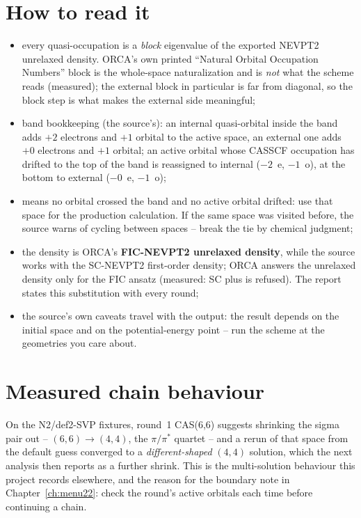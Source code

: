 \section{How to read it}

\begin{readbox}
\begin{itemize}
  \item every quasi-occupation is a \emph{block} eigenvalue of the exported
    NEVPT2 unrelaxed density.  ORCA's own printed ``Natural Orbital Occupation
    Numbers'' block is the whole-space naturalization and is \emph{not} what
    the scheme reads (measured); the external block in particular is far from
    diagonal, so the block step is what makes the external side meaningful;
  \item band bookkeeping (the source's): an internal quasi-orbital inside the
    band adds $+2$ electrons and $+1$ orbital to the active space, an external
    one adds $+0$ electrons and $+1$ orbital; an active orbital whose CASSCF
    occupation has drifted to the top of the band is reassigned to internal
    ($-2$~e, $-1$~o), at the bottom to external ($-0$~e, $-1$~o);
  \item {} means no orbital crossed the band and no active
    orbital drifted: use that space for the production calculation.  If the
    same space was visited before, the source warns of cycling between spaces
    -- break the tie by chemical judgment;
  \item the density is ORCA's \textbf{FIC-NEVPT2 unrelaxed density}, while the
    source works with the SC-NEVPT2 first-order density; ORCA answers the
    unrelaxed density only for the FIC ansatz (measured: SC plus
     is refused).  The report states this substitution
    with every round;
  \item the source's own caveats travel with the output: the result depends on
    the initial space and on the potential-energy point -- run the scheme at
    the geometries you care about.
\end{itemize}
\end{readbox}

\section{Measured chain behaviour}

On the N2/def2-SVP fixtures, round~1 CAS(6,6) suggests shrinking the sigma
pair out -- $(6,6) \to (4,4)$, the $\pi/\pi^{*}$ quartet -- and a rerun of that
space from the default guess converged to a \emph{different-shaped} $(4,4)$
solution, which the next analysis then reports as a further shrink.  This is
the multi-solution behaviour this project records elsewhere, and the reason
for the boundary note in Chapter~\ref{ch:menu22}: check the round's active
orbitals each time before continuing a chain.
